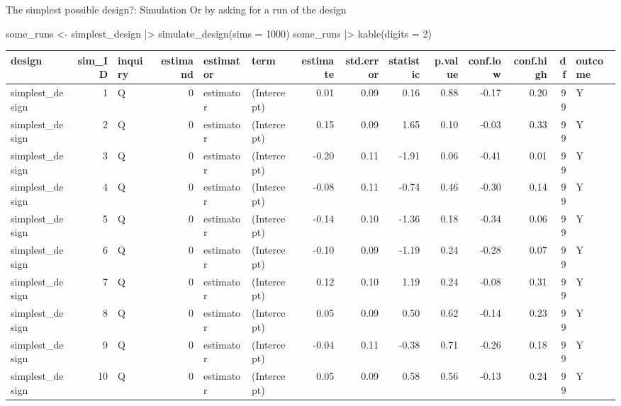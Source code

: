 \documentclass[
  11pt,
  ignorenonframetext,
]{beamer}
\newenvironment{Shaded}{\begin{snugshade}}{\end{snugshade}}
\newcommand{\AttributeTok}[1]{\textcolor[rgb]{0.40,0.45,0.13}{#1}}
\newcommand{\DecValTok}[1]{\textcolor[rgb]{0.68,0.00,0.00}{#1}}
\newcommand{\FunctionTok}[1]{\textcolor[rgb]{0.28,0.35,0.67}{#1}}
\newcommand{\NormalTok}[1]{\textcolor[rgb]{0.00,0.23,0.31}{#1}}
\newcommand{\OtherTok}[1]{\textcolor[rgb]{0.00,0.23,0.31}{#1}}
\newcommand{\SpecialCharTok}[1]{\textcolor[rgb]{0.37,0.37,0.37}{#1}}
\begin{document}
\begin{frame}[fragile]{The simplest possible design?: Simulation}
\protect\hypertarget{the-simplest-possible-design-simulation}{}
Or by asking for a run of the design

\begin{Shaded}
\begin{Highlighting}[]
\NormalTok{some\_runs }\OtherTok{\textless{}{-}}\NormalTok{ simplest\_design }\SpecialCharTok{|\textgreater{}} \FunctionTok{simulate\_design}\NormalTok{(}\AttributeTok{sims =} \DecValTok{1000}\NormalTok{)}
\NormalTok{some\_runs }\SpecialCharTok{|\textgreater{}} \FunctionTok{kable}\NormalTok{(}\AttributeTok{digits =} \DecValTok{2}\NormalTok{)}
\end{Highlighting}
\end{Shaded}

\begin{tabular}{l|r|l|r|l|l|r|r|r|r|r|r|r|l}
\hline
design & sim\_ID & inquiry & estimand & estimator & term & estimate & std.error & statistic & p.value & conf.low & conf.high & df & outcome\\
\hline
simplest\_design & 1 & Q & 0 & estimator & (Intercept) & 0.01 & 0.09 & 0.16 & 0.88 & -0.17 & 0.20 & 99 & Y\\
\hline
simplest\_design & 2 & Q & 0 & estimator & (Intercept) & 0.15 & 0.09 & 1.65 & 0.10 & -0.03 & 0.33 & 99 & Y\\
\hline
simplest\_design & 3 & Q & 0 & estimator & (Intercept) & -0.20 & 0.11 & -1.91 & 0.06 & -0.41 & 0.01 & 99 & Y\\
\hline
simplest\_design & 4 & Q & 0 & estimator & (Intercept) & -0.08 & 0.11 & -0.74 & 0.46 & -0.30 & 0.14 & 99 & Y\\
\hline
simplest\_design & 5 & Q & 0 & estimator & (Intercept) & -0.14 & 0.10 & -1.36 & 0.18 & -0.34 & 0.06 & 99 & Y\\
\hline
simplest\_design & 6 & Q & 0 & estimator & (Intercept) & -0.10 & 0.09 & -1.19 & 0.24 & -0.28 & 0.07 & 99 & Y\\
\hline
simplest\_design & 7 & Q & 0 & estimator & (Intercept) & 0.12 & 0.10 & 1.19 & 0.24 & -0.08 & 0.31 & 99 & Y\\
\hline
simplest\_design & 8 & Q & 0 & estimator & (Intercept) & 0.05 & 0.09 & 0.50 & 0.62 & -0.14 & 0.23 & 99 & Y\\
\hline
simplest\_design & 9 & Q & 0 & estimator & (Intercept) & -0.04 & 0.11 & -0.38 & 0.71 & -0.26 & 0.18 & 99 & Y\\
\hline
simplest\_design & 10 & Q & 0 & estimator & (Intercept) & 0.05 & 0.09 & 0.58 & 0.56 & -0.13 & 0.24 & 99 & Y\\

\end{tabular}
\end{frame}
\end{document}
